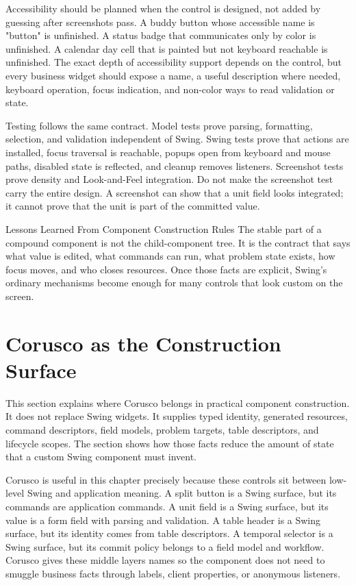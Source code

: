 Accessibility should be planned when the control is designed, not added by guessing
after screenshots pass. A buddy button whose accessible name is "button" is unfinished.
A status badge that communicates only by color is unfinished. A calendar day cell that
is painted but not keyboard reachable is unfinished. The exact depth of accessibility
support depends on the control, but every business widget should expose a name, a useful
description where needed, keyboard operation, focus indication, and non-color ways to
read validation or state.

Testing follows the same contract. Model tests prove parsing, formatting, selection, and
validation independent of Swing. Swing tests prove that actions are installed, focus
traversal is reachable, popups open from keyboard and mouse paths, disabled state is
reflected, and cleanup removes listeners. Screenshot tests prove density and
Look-and-Feel integration. Do not make the screenshot test carry the entire design. A
screenshot can show that a unit field looks integrated; it cannot prove that the unit is
part of the committed value.

\begin{principlebox}{Lessons Learned From Component Construction Rules}
The stable part of a compound component is not the child-component tree. It is
the contract that says what value is edited, what commands can run, what problem
state exists, how focus moves, and who closes resources. Once those facts are
explicit, Swing's ordinary mechanisms become enough for many controls that look
custom on the screen.
\end{principlebox}

\section{Corusco as the Construction Surface}

\begin{roadmapbox}
This section explains where Corusco belongs in practical component construction.
It does not replace Swing widgets. It supplies typed identity, generated
resources, command descriptors, field models, problem targets, table
descriptors, and lifecycle scopes. The section shows how those facts reduce the
amount of state that a custom Swing component must invent.
\end{roadmapbox}

Corusco is useful in this chapter precisely because these controls sit between low-level
Swing and application meaning. A split button is a Swing surface, but its commands are
application commands. A unit field is a Swing surface, but its value is a form field
with parsing and validation. A table header is a Swing surface, but its identity comes
from table descriptors. A temporal selector is a Swing surface, but its commit policy
belongs to a field model and workflow. Corusco gives these middle layers names so the
component does not need to smuggle business facts through labels, client properties, or
anonymous listeners.

